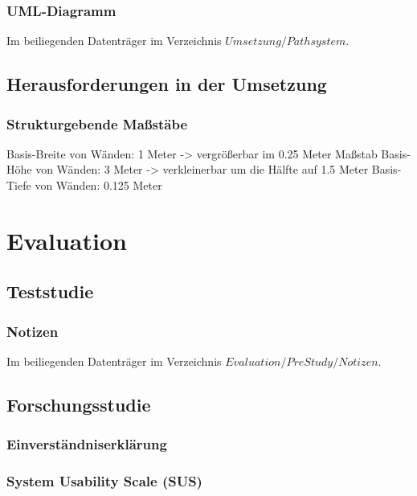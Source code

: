 \documentclass[
	12pt,
	a4paper,
	bibtotoc,
	cleardoubleempty, 
	idxtotoc,
	ngerman,
	openright
	final,
	listof=nochaptergap,
	]{scrbook}
\begin{document}
\begin{appendices}
\subsubsection{UML-Diagramm}\label{sec:append_realisation_uml_path}
Im beiliegenden Datenträger im Verzeichnis $Umsetzung/Pathsystem$. 

\subsection{Herausforderungen in der Umsetzung}

\subsubsection{Strukturgebende Maßstäbe}\label{sec:append_realisation_maßstaebe}
Basis-Breite von Wänden: 1 Meter -> vergrößerbar im 0.25 Meter Maßstab
Basis-Höhe von Wänden: 3 Meter -> verkleinerbar um die Hälfte auf 1.5 Meter
Basis-Tiefe von Wänden: 0.125 Meter

\section{Evaluation}

\subsection{Teststudie}

\subsubsection{Notizen}\label{sec:append_evaluation_pre_study_notes}
Im beiliegenden Datenträger im Verzeichnis $Evaluation/PreStudy/Notizen$.

\subsection{Forschungsstudie}

\subsubsection{Einverständniserklärung}\label{sec:append_study_consent}



\subsubsection{System Usability Scale (SUS)}\label{sec:append_study_sus}


\end{appendices}
\end{document}
